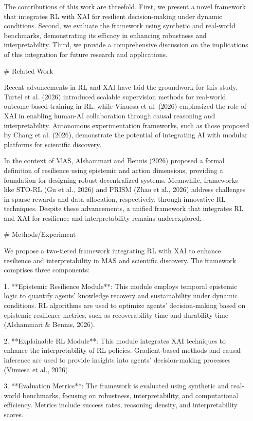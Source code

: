 The contributions of this work are threefold. First, we present a novel framework that integrates RL with XAI for resilient decision-making under dynamic conditions. Second, we evaluate the framework using synthetic and real-world benchmarks, demonstrating its efficacy in enhancing robustness and interpretability. Third, we provide a comprehensive discussion on the implications of this integration for future research and applications.

# Related Work

Recent advancements in RL and XAI have laid the groundwork for this study. Turtel et al. (2026) introduced scalable supervision methods for real-world outcome-based training in RL, while Vinuesa et al. (2026) emphasized the role of XAI in enabling human-AI collaboration through causal reasoning and interpretability. Autonomous experimentation frameworks, such as those proposed by Chang et al. (2026), demonstrate the potential of integrating AI with modular platforms for scientific discovery.

In the context of MAS, Alshammari and Bennis (2026) proposed a formal definition of resilience using epistemic and action dimensions, providing a foundation for designing robust decentralized systems. Meanwhile, frameworks like STO-RL (Gu et al., 2026) and PRISM (Zhao et al., 2026) address challenges in sparse rewards and data allocation, respectively, through innovative RL techniques. Despite these advancements, a unified framework that integrates RL and XAI for resilience and interpretability remains underexplored.

# Methods/Experiment

We propose a two-tiered framework integrating RL with XAI to enhance resilience and interpretability in MAS and scientific discovery. The framework comprises three components:

1. **Epistemic Resilience Module**: This module employs temporal epistemic logic to quantify agents' knowledge recovery and sustainability under dynamic conditions. RL algorithms are used to optimize agents' decision-making based on epistemic resilience metrics, such as recoverability time and durability time (Alshammari & Bennis, 2026).

2. **Explainable RL Module**: This module integrates XAI techniques to enhance the interpretability of RL policies. Gradient-based methods and causal inference are used to provide insights into agents' decision-making processes (Vinuesa et al., 2026).

3. **Evaluation Metrics**: The framework is evaluated using synthetic and real-world benchmarks, focusing on robustness, interpretability, and computational efficiency. Metrics include success rates, reasoning density, and interpretability scores.

